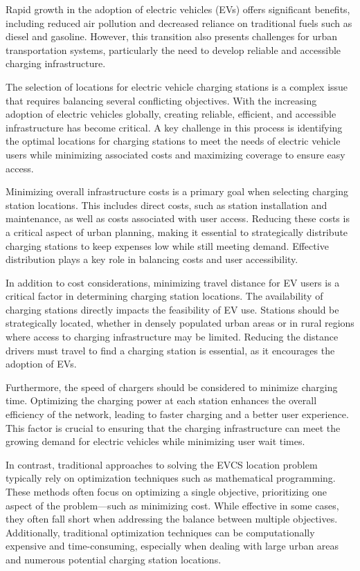 Rapid growth in the adoption of electric vehicles (EVs) offers significant benefits, including reduced air pollution and decreased reliance on traditional fuels such as diesel and gasoline. However, this transition also presents challenges for urban transportation systems, particularly the need to develop reliable and accessible charging infrastructure.

The selection of locations for electric vehicle charging stations is a complex issue that requires balancing several conflicting objectives. With the increasing adoption of electric vehicles globally, creating reliable, efficient, and accessible infrastructure has become critical. A key challenge in this process is identifying the optimal locations for charging stations to meet the needs of electric vehicle users while minimizing associated costs and maximizing coverage to ensure easy access.



Minimizing overall infrastructure costs is a primary goal when selecting charging station locations. This includes direct costs, such as station installation and maintenance, as well as costs associated with user access. Reducing these costs is a critical aspect of urban planning, making it essential to strategically distribute charging stations to keep expenses low while still meeting demand. Effective distribution plays a key role in balancing costs and user accessibility.

In addition to cost considerations, minimizing travel distance for EV users is a critical factor in determining charging station locations. The availability of charging stations directly impacts the feasibility of EV use. Stations should be strategically located, whether in densely populated urban areas or in rural regions where access to charging infrastructure may be limited. Reducing the distance drivers must travel to find a charging station is essential, as it encourages the adoption of EVs.

Furthermore, the speed of chargers should be considered to minimize charging time. Optimizing the charging power at each station enhances the overall efficiency of the network, leading to faster charging and a better user experience. This factor is crucial to ensuring that the charging infrastructure can meet the growing demand for electric vehicles while minimizing user wait times.

In contrast, traditional approaches to solving the EVCS location problem typically rely on optimization techniques such as mathematical programming. These methods often focus on optimizing a single objective, prioritizing one aspect of the problem—such as minimizing cost. While effective in some cases, they often fall short when addressing the balance between multiple objectives. Additionally, traditional optimization techniques can be computationally expensive and time-consuming, especially when dealing with large urban areas and numerous potential charging station locations.

